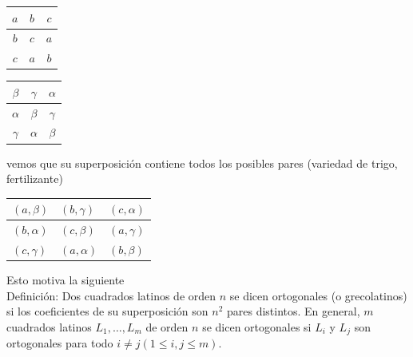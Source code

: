\documentclass[10pt]{article}
\begin{document}
\begin{center}
\begin{tabular}{|c|c|c|}
\hline
$a$ & $b$ & $c$ \\
\hline
$b$ & $c$ & $a$ \\
\hline
$c$ & $a$ & $b$ \\
\hline
\end{tabular}
\end{center}

\begin{center}
\begin{tabular}{|c|c|c|}
\hline
$\beta$ & $\gamma$ & $\alpha$ \\
\hline
$\alpha$ & $\beta$ & $\gamma$ \\
\hline
$\gamma$ & $\alpha$ & $\beta$ \\
\hline
\end{tabular}
\end{center}

vemos que su superposición contiene todos los posibles pares (variedad de trigo, fertilizante)

\begin{center}
\begin{tabular}{|l|l|l|}
\hline
$(a, \beta)$ & $(b, \gamma)$ & $(c, \alpha)$ \\
\hline
$(b, \alpha)$ & $(c, \beta)$ & $(a, \gamma)$ \\
\hline
$(c, \gamma)$ & $(a, \alpha)$ & $(b, \beta)$ \\
\hline
\end{tabular}
\end{center}

Esto motiva la siguiente\\
Definición: Dos cuadrados latinos de orden $n$ se dicen ortogonales (o grecolatinos) si los coeficientes de su superposición son $n^{2}$ pares distintos. En general, $m$ cuadrados latinos $L_{1}, \ldots, L_{m}$ de orden $n$ se dicen ortogonales si $L_{i}$ y $L_{j}$ son ortogonales para todo $i \neq j (1 \leq i, j \leq m)$.
\end{document}
